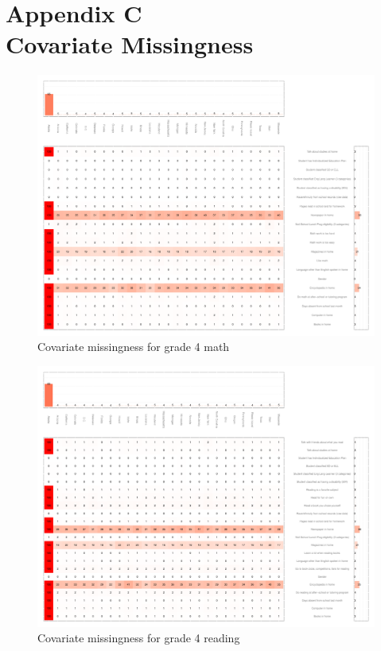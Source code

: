 \clearpage
{}
\section*{Appendix C\\Covariate Missingness}
\label{appendixmissing}

\begin{figure}[h]
\begin{center}
\includegraphics[width=\textwidth]{../Figures2009/g4math-missing.pdf}
\caption{Covariate missingness for grade 4 math}
\label{fig:g4math:missing}
\end{center}
\end{figure}

\begin{figure}[h]
\begin{center}
\includegraphics[width=\textwidth]{../Figures2009/g4read-missing.pdf}
\caption{Covariate missingness for grade 4 reading}
\label{fig:g4reading:missing}
\end{center}
\end{figure}

